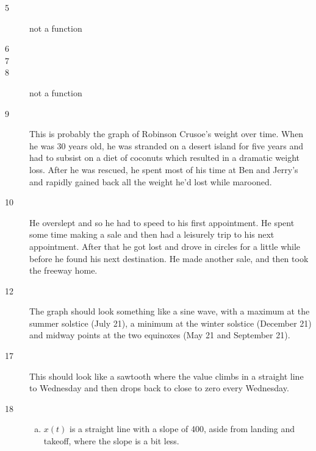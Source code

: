 \documentclass[letterpaper, landscape]{exam}
\begin{document}
\begin{description}
      \item[5] not a function

      \item[6] 

      \item[7] 

      \item[8] not a function

      \item[9] This is probably the graph of Robinson Crusoe's weight over time.
        When he was 30 years old, he was stranded on a desert island for five
        years and had to subsist on a diet of coconuts which resulted in a
        dramatic weight loss. After he was rescued, he spent most of his time
        at Ben and Jerry's and rapidly gained back all the weight he'd lost
        while marooned.

      \item[10]
        He overslept and so he had to speed to his first appointment. He spent
        some time making a sale and then had a leisurely trip to his next
        appointment. After that he got lost and drove in circles for a little
        while before he found his next destination. He made another sale, and
        then took the freeway home.

      \item[12] The graph should look something like a sine wave, with a maximum at
        the summer solstice (July 21), a minimum at the winter solstice
        (December 21) and midway points at the two equinoxes (May 21 and
        September 21).

      \item[17] This should look like a sawtooth where the value climbs in a
        straight line to Wednesday and then drops back to close to zero every
        Wednesday.

      \item[18]
        \begin{enumerate}[(a)]
          \item $x(t)$ is a straight line with a slope of 400, aside from
            landing and takeoff, where the slope is a bit less.


\end{enumerate}
\end{description}
\end{document}
